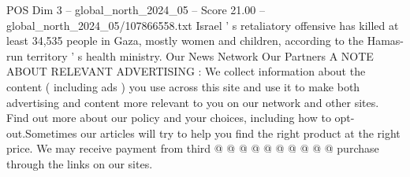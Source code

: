 \begin{textsample}{POS Dim 3 – global\_north\_2024\_05 – Score 21.00 – global\_north\_2024\_05/107866558.txt}
Israel ' s retaliatory offensive has killed at least 34,535 people in Gaza, mostly women and children, according to the Hamas-run territory ' s health ministry.
Our News Network Our Partners A NOTE ABOUT RELEVANT ADVERTISING : We collect information about the content ( including ads ) you use across this site and use it to make both advertising and content more relevant to you on our network and other sites.
Find out more about our policy and your choices, including how to opt-out.Sometimes our articles will try to help you find the right product at the right price.
We may receive payment from third @ @ @ @ @ @ @ @ @ @ purchase through the links on our sites.

\end{textsample}
